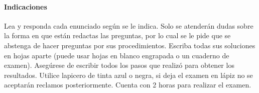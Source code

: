 \begin{center}
  {\large \thepartial} \hfill
  {\large \thecycle} %
\end{center}
  \paragraph{Indicaciones}
  Lea y responda cada enunciado según se le indica. 
  Solo se atenderán dudas sobre la forma en que están redactas las preguntas, 
  por lo cual se le pide que se abstenga de hacer preguntas por sus 
  procedimientos.
  Escriba todas sus soluciones en hojas aparte (puede usar hojas en blanco
  engrapada o un cuaderno de examen).
  Asegúrese de escribir todos los pasos que realizó para obtener los
  resultados.
  Utilice lapicero de tinta azul o negra, si deja el examen en lápiz no se
  aceptarán reclamos posteriormente.
  Cuenta con 2 horas para realizar el examen.

